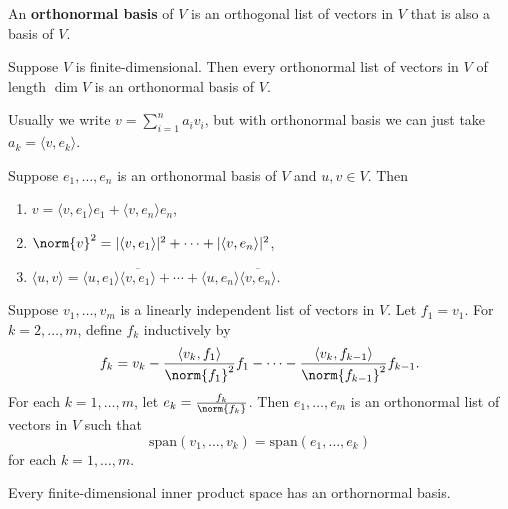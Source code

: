 \documentclass{extarticle}
\begin{document}
\begin{definition}
    An \textbf{orthonormal basis} of \(V\) is an orthogonal list of vectors in \(V\) that is
    also a basis of \(V\).
\end{definition}

\begin{corollary}
    Suppose \(V\) is finite-dimensional. Then every orthonormal list of vectors in \(V\)
    of length \(\dim V\) is an orthonormal basis of \(V\).
\end{corollary}

\begin{remark}
    Usually we write \(v = \sum_{i=1}^{n} a_i v_i\), but with orthonormal basis we can just
    take \(a_k = \langle v,e_k \rangle\).
\end{remark}

\begin{lemma}
    Suppose \(e_1, \ldots, e_n\) is an orthonormal basis of \(V\) and \(u, v \in V\). Then
    \begin{enumerate}[label=(\alph*)]
        \item \(v = \langle v,e_1 \rangle e_1 + \langle v,e_n \rangle e_n\),
        \item \(\norm{v}^2 = |\langle v,e_1 \rangle|^2 + \cdots + |\langle v,e_n \rangle|^2\),
        \item \(\langle u,v \rangle = \langle u,e_1 \rangle \overline{\langle v, e_1 \rangle} + \cdots + \langle u,e_n \rangle
        \overline{\langle v,e_n \rangle}\).
    \end{enumerate}
\end{lemma}

\begin{thm}
    Suppose \(v_1, \ldots, v_m\) is a linearly independent list of vectors in \(V\). Let \(f_1 = v_1\).
    For \(k = 2, \ldots, m\), define \(f_k\) inductively by
    \[f_k = v_k - \frac{\langle v_k,f_1 \rangle}{\norm{f_1}^2}f_1 - \cdots - \frac{\langle v_k, f_{k-1} \rangle}{\norm{f_{k-1}}^2}f_{k-1}.\]
    For each \(k = 1,\ldots, m\), let \(e_k = \frac{f_k}{\norm{f_k}}\). Then \(e_1, \ldots, e_m\) is an
    orthonormal list of vectors in \(V\) such that
    \[\text{span}(v_1, \ldots, v_k) = \text{span}(e_1, \ldots, e_k)\]
    for each \(k = 1, \ldots, m\).
\end{thm}

\begin{corollary}
    Every finite-dimensional inner product space has an orthornormal basis.
\end{corollary}
\end{document}
